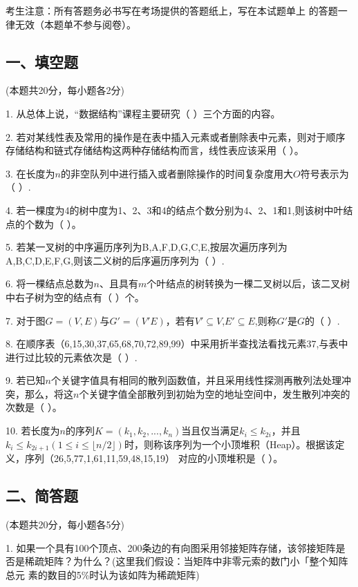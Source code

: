 

考生注意：所有答题务必书写在考场提供的答题纸上，写在本试题单上 的答题一律无效（本题单不参与阅卷）。

\subsection{一、填空题}
(本题共20分，每小题各2分)

1. 从总体上说，“数据结构”课程主要研究（    ）三个方面的内容。

2. 若对某线性表及常用的操作是在表中插入元素或者删除表中元素，则对于顺序存储结构和链式存储结构这两种存储结构而言，线性表应该采用（    ）。

3. 在长度为$n$的非空队列中进行插入或者删除操作的时间复杂度用大$O$符号表示为（    ）.

4. 若一棵度为4的树中度为1、2、3和4的结点个数分别为4、2、1和1,则该树中叶结点的个数为（    ）。

5. 若某一叉树的中序遍历序列为B,A,F,D,G,C,E,按层次遍历序列为A,B,C,D,E,F,G,则该二义树的后序遍历序列为（    ）.

6. 将一棵结点总数为$n$、且具有$m$个叶结点的树转换为一棵二叉树以后，该二叉树中右子树为空的结点有（    ）个。

7. 对于图$G=(V,E)$与$G'=(V'E)$，若有$V'\subseteq V$,$E'\subseteq E$,则称$G'$是$G$的（    ）.

8. 在顺序表（6,15,30,37,65,68,70,72,89,99）中采用折半查找法看找元素37,与表中进行过比较的元素依次是（    ）.

9. 若已知$n$个关键字值具有相同的散列函数值，并且采用线性探测再散列法处理冲突，那么，将这$n$个关键字值全部散列到初始为空的地址空间中，发生散列冲突的次数是（    ）。

10. 若长度为$n$的序列$K=(k_1,k_2,...,k_n)$当且仅当满足$k_i\leqslant k_{2i}$，并且$k_i\leqslant k_{2i+1} (1\leqslant i\leqslant \lfloor n/2 \rfloor)$时，则称该序列为一个小顶堆积（Heap）。根据该定义，序列（26,5,77,1,61,11,59,48,15,19） 对应的小顶堆积是（     ）。

\subsection{二、简答题}
(本题共20分，每小题各5分)

1. 如果一个具有100个顶点、200条边的有向图采用邻接矩阵存储，该邻接矩阵是 否是稀疏矩阵？为什么？(这里我们假设：当矩阵中非零元索的数门小「整个知阵总元 素的数目的5\%时认为该如阵为稀疏矩阵)

